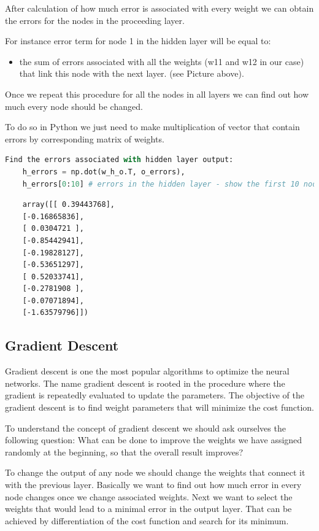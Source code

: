 After calculation of how much error is associated with every weight we can obtain the errors for the nodes in the proceeding layer.
 
For instance error term for node 1 in the hidden layer will be equal to:
\begin{itemize}
   \item the sum of errors associated with all the weights (w11 and w12 in our case) that link this node with the next layer. (see Picture above).
\end{itemize}


Once we repeat this procedure for all the nodes in all layers we can find out how much every node should be changed.

To do so in Python we just need to make multiplication of vector that contain errors by corresponding matrix of weights.

\begin{lstlisting}[language=Python]
    Find the errors associated with hidden layer output:
    h_errors = np.dot(w_h_o.T, o_errors),
    h_errors[0:10] # errors in the hidden layer - show the first 10 nodes out of 90.
\end{lstlisting}

\begin{lstlisting}
    array([[ 0.39443768],
    [-0.16865836],
    [ 0.0304721 ],
    [-0.85442941],
    [-0.19828127],
    [-0.53651297],
    [ 0.52033741],
    [-0.2781908 ],
    [-0.07071894],
    [-1.63579796]])
\end{lstlisting}

\subsection{Gradient Descent}

Gradient descent is one the most popular algorithms to optimize the neural networks. The name gradient descent is rooted in the procedure where the gradient is repeatedly evaluated to update the parameters. The objective of the gradient descent is to find weight parameters that will minimize the cost function.

To understand the concept of gradient descent we should ask ourselves the following question: What can be done to improve the weights we have assigned randomly at the beginning, so that the overall result improves?

To change the output of any node we should change the weights that connect it with the previous layer. Basically we want to find out how much error in every node changes once we change associated weights. Next we want to select the weights that would lead to a minimal error in the output layer. That can be achieved by differentiation of the cost function and search for its minimum.

